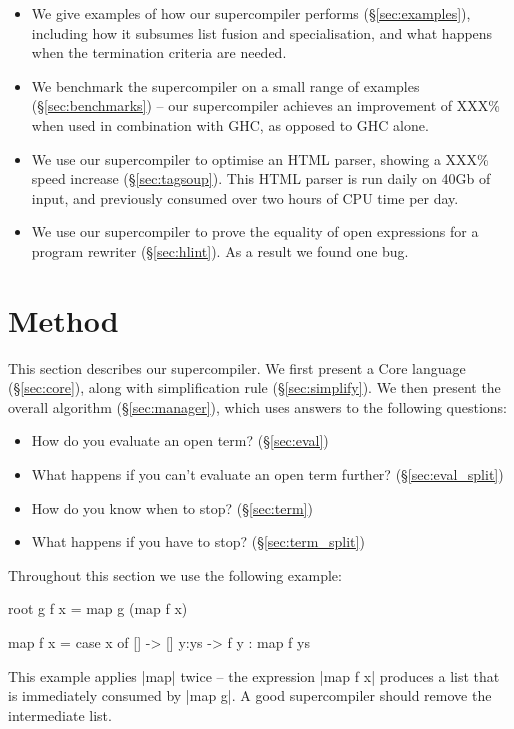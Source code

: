 \documentclass[draft]{sigplanconf}
\newcommand{\unknown}{XXX}
\begin{document}
\begin{itemize}
\item We give examples of how our supercompiler performs (\S\ref{sec:examples}), including how it subsumes list fusion and specialisation, and what happens when the termination criteria are needed.
\item We benchmark the supercompiler on a small range of examples (\S\ref{sec:benchmarks}) -- our supercompiler achieves an improvement of \unknown{}\% when used in combination with GHC, as opposed to GHC alone.
\item We use our supercompiler to optimise an HTML parser, showing a \unknown{}\% speed increase (\S\ref{sec:tagsoup}). This HTML parser is run daily on 40Gb of input, and previously consumed over two hours of CPU time per day.
\item We use our supercompiler to prove the equality of open expressions for a program rewriter (\S\ref{sec:hlint}). As a result we found one bug.
\end{itemize}

\section{Method}
\label{sec:method}

This section describes our supercompiler. We first present a Core language (\S\ref{sec:core}), along with simplification rule (\S\ref{sec:simplify}). We then present the overall algorithm (\S\ref{sec:manager}), which uses answers to the following questions:

\begin{itemize}
\item How do you evaluate an open term? (\S\ref{sec:eval})
\item What happens if you can't evaluate an open term further? (\S\ref{sec:eval_split})
\item How do you know when to stop? (\S\ref{sec:term})
\item What happens if you have to stop? (\S\ref{sec:term_split})
\end{itemize}

Throughout this section we use the following example:

\begin{code}
root g f x = map g (map f x)

map f x = case x of
    []    -> []
    y:ys  -> f y : map f ys
\end{code}

This example applies |map| twice -- the expression |map f x| produces a list that is immediately consumed by |map g|. A good supercompiler should remove the intermediate list.
\end{document}
